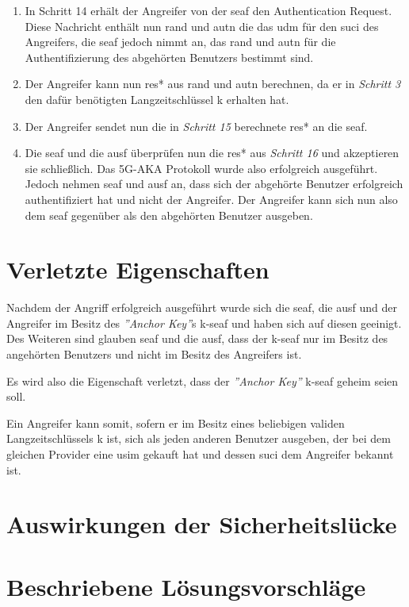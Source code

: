 \begin{enumerate}
\item In Schritt 14 erhält der Angreifer von der \gls{seaf} den Authentication Request.
Diese Nachricht enthält nun \gls{rand} und \gls{autn} die das \gls{udm} für den \gls{suci} des Angreifers, die \gls{seaf} jedoch nimmt an, das \gls{rand} und \gls{autn} für die Authentifizierung des abgehörten Benutzers bestimmt sind.

\item Der Angreifer kann nun \gls{res*} aus \gls{rand} und \gls{autn} berechnen, da er in \textit{Schritt 3} den dafür benötigten Langzeitschlüssel \gls{k} erhalten hat.

\item Der Angreifer sendet nun die in \textit{Schritt 15} berechnete \gls{res*} an die \gls{seaf}.

\item Die \gls{seaf} und die \gls{ausf} überprüfen nun die \gls{res*} aus \textit{Schritt 16} und akzeptieren sie schließlich.
Das 5G-AKA Protokoll wurde also erfolgreich ausgeführt.
Jedoch nehmen \gls{seaf} und \gls{ausf} an, dass sich der abgehörte Benutzer erfolgreich authentifiziert hat und nicht der Angreifer.
Der Angreifer kann sich nun also dem \gls{seaf} gegenüber als den abgehörten Benutzer ausgeben.

\end{enumerate}


\section{Verletzte Eigenschaften}

Nachdem der Angriff erfolgreich ausgeführt wurde sich die \gls{seaf}, die \gls{ausf} und der Angreifer im Besitz des \textit{''Anchor Key''}s \gls{k-seaf} und haben sich auf diesen geeinigt.
Des Weiteren sind glauben \gls{seaf} und die \gls{ausf}, dass der \gls{k-seaf} nur im Besitz des angehörten Benutzers und nicht im Besitz des Angreifers ist.

Es wird also die Eigenschaft verletzt, dass der \textit{''Anchor Key''} \gls{k-seaf} geheim seien soll.

Ein Angreifer kann somit, sofern er im Besitz eines beliebigen validen Langzeitschlüssels \gls{k} ist, sich als jeden anderen Benutzer ausgeben, der bei dem gleichen Provider eine \gls{usim} gekauft hat und dessen \gls{suci} dem Angreifer bekannt ist.


\section{Auswirkungen der Sicherheitslücke}

\section{Beschriebene Lösungsvorschläge}
